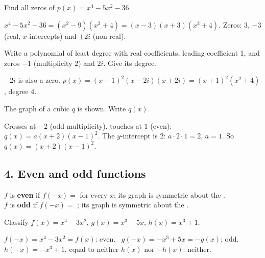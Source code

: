 Find all zeros of $p(x)=x^4-5x^2-36$.
\begin{workspace}[2.6cm]
$x^4-5x^2-36=(x^2-9)(x^2+4)=(x-3)(x+3)(x^2+4)$. Zeros: $3$, $-3$ (real, $x$-intercepts) and $\pm2i$ (non-real).
\end{workspace}

Write a polynomial of least degree with real coefficients, leading coefficient 1, and zeros $-1$ (multiplicity 2) and $2i$. Give its degree.
\begin{workspace}[2.6cm]
$-2i$ is also a zero. $p(x)=(x+1)^2(x-2i)(x+2i)=(x+1)^2(x^2+4)$, degree 4.
\end{workspace}

\begin{center}
\end{center}
The graph of a cubic $q$ is shown. Write $q(x)$.
\begin{workspace}[2.6cm]
Crosses at $-2$ (odd multiplicity), touches at $1$ (even): $q(x)=a(x+2)(x-1)^2$. The $y$-intercept is $2$: $a\cdot2\cdot1=2$, $a=1$. So $q(x)=(x+2)(x-1)^2$.
\end{workspace}

\subsection*{4. Even and odd functions}
\begin{keyidea}
$f$ is \textbf{even} if $f(-x)=$  for every $x$; its graph is symmetric about the .\\
$f$ is \textbf{odd} if $f(-x)=$ ; its graph is symmetric about the .
\end{keyidea}

Classify $f(x)=x^4-3x^2$, $g(x)=x^3-5x$, $h(x)=x^3+1$.
\begin{workspace}[2.4cm]
$f(-x)=x^4-3x^2=f(x)$: even. \ $g(-x)=-x^3+5x=-g(x)$: odd. \ $h(-x)=-x^3+1$, equal to neither $h(x)$ nor $-h(x)$: neither.
\end{workspace}

